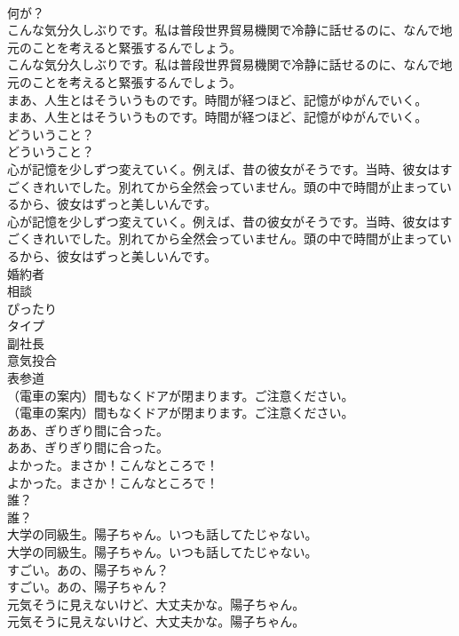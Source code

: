 \documentclass[8pt]{extreport}
\begin{document}
\begin{CJK}{UTF8}{min}
\\	何が？ 
\\	こんな気分久しぶりです。私は普段世界貿易機関で冷静に話せるのに、なんで地元のことを考えると緊張するんでしょう。	
\\	こんな気分久しぶりです。私は普段世界貿易機関で冷静に話せるのに、なんで地元のことを考えると緊張するんでしょう。 
\\	まあ、人生とはそういうものです。時間が経つほど、記憶がゆがんでいく。	
\\	まあ、人生とはそういうものです。時間が経つほど、記憶がゆがんでいく。 
\\	どういうこと？	
\\	どういうこと？ 
\\	心が記憶を少しずつ変えていく。例えば、昔の彼女がそうです。当時、彼女はすごくきれいでした。別れてから全然会っていません。頭の中で時間が止まっているから、彼女はずっと美しいんです。	
\\	心が記憶を少しずつ変えていく。例えば、昔の彼女がそうです。当時、彼女はすごくきれいでした。別れてから全然会っていません。頭の中で時間が止まっているから、彼女はずっと美しいんです。 
\\	婚約者
\\	相談
\\	ぴったり
\\	タイプ
\\	副社長
\\	意気投合
\\	表参道
\\	（電車の案内）間もなくドアが閉まります。ご注意ください。	
\\	（電車の案内）間もなくドアが閉まります。ご注意ください。 
\\	ああ、ぎりぎり間に合った。	
\\	ああ、ぎりぎり間に合った。 
\\	よかった。まさか！こんなところで！	
\\	よかった。まさか！こんなところで！ 
\\	誰？	
\\	誰？ 
\\	大学の同級生。陽子ちゃん。いつも話してたじゃない。	
\\	大学の同級生。陽子ちゃん。いつも話してたじゃない。 
\\	すごい。あの、陽子ちゃん？	
\\	すごい。あの、陽子ちゃん？ 
\\	元気そうに見えないけど、大丈夫かな。陽子ちゃん。	
\\	元気そうに見えないけど、大丈夫かな。陽子ちゃん。 

\end{CJK}
\end{document}
